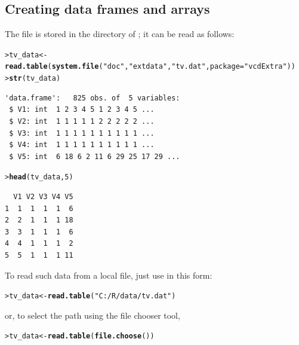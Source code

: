 \documentclass[10pt,krantz2]{krantz}\usepackage[]{graphicx}\usepackage[]{color}
\makeatletter
\newcommand{\hlnum}[1]{\textcolor[rgb]{0.686,0.059,0.569}{#1}}%
\newcommand{\hlstr}[1]{\textcolor[rgb]{0.192,0.494,0.8}{#1}}%
\newcommand{\hlstd}[1]{\textcolor[rgb]{0.345,0.345,0.345}{#1}}%
\newcommand{\hlkwb}[1]{\textcolor[rgb]{0.69,0.353,0.396}{#1}}%
\newcommand{\hlkwc}[1]{\textcolor[rgb]{0.333,0.667,0.333}{#1}}%
\newcommand{\hlkwd}[1]{\textcolor[rgb]{0.737,0.353,0.396}{\textbf{#1}}}%
\newenvironment{kframe}{%
 \def\at@end@of@kframe{}%
 \ifinner\ifhmode%
  \def\at@end@of@kframe{\end{minipage}}%
  \begin{minipage}{\columnwidth}%
 \fi\fi%
 \def\FrameCommand##1{\hskip\@totalleftmargin \hskip-\fboxsep
 \colorbox{shadecolor}{##1}\hskip-\fboxsep
     \hskip-\linewidth \hskip-\@totalleftmargin \hskip\columnwidth}%
 \MakeFramed {\advance\hsize-\width
   \@totalleftmargin\z@ \linewidth\hsize
   \@setminipage}}%
 {\par\unskip\endMakeFramed%
 \at@end@of@kframe}
\newenvironment{knitrout}{}{} %
\renewenvironment{knitrout}{\small\renewcommand{\baselinestretch}{.85}}{} %
\makeatother
\begin{document}
\subsection{Creating data frames and arrays}
The file  is stored in the  directory
of ; it can be read as follows:
\begin{knitrout}
\color{fgcolor}\begin{kframe}
\begin{alltt}
\hlstd{> }\hlstd{tv_data} \hlkwb{<-} \hlkwd{read.table}\hlstd{(}\hlkwd{system.file}\hlstd{(}\hlstr{"doc"}\hlstd{,} \hlstr{"extdata"}\hlstd{,} \hlstr{"tv.dat"}\hlstd{,} \hlkwc{package} \hlstd{=} \hlstr{"vcdExtra"}\hlstd{))}
\hlstd{> }\hlkwd{str}\hlstd{(tv_data)}
\end{alltt}
\begin{verbatim}
'data.frame':	825 obs. of  5 variables:
 $ V1: int  1 2 3 4 5 1 2 3 4 5 ...
 $ V2: int  1 1 1 1 1 2 2 2 2 2 ...
 $ V3: int  1 1 1 1 1 1 1 1 1 1 ...
 $ V4: int  1 1 1 1 1 1 1 1 1 1 ...
 $ V5: int  6 18 6 2 11 6 29 25 17 29 ...
\end{verbatim}
\begin{alltt}
\hlstd{> }\hlkwd{head}\hlstd{(tv_data,} \hlnum{5}\hlstd{)}
\end{alltt}
\begin{verbatim}
  V1 V2 V3 V4 V5
1  1  1  1  1  6
2  2  1  1  1 18
3  3  1  1  1  6
4  4  1  1  1  2
5  5  1  1  1 11
\end{verbatim}
\end{kframe}
\end{knitrout}
To read such data from a local file, just use  in this form:
\begin{knitrout}
\color{fgcolor}\begin{kframe}
\begin{alltt}
\hlstd{> }\hlstd{tv_data} \hlkwb{<-} \hlkwd{read.table}\hlstd{(}\hlstr{"C:/R/data/tv.dat"}\hlstd{)}
\end{alltt}
\end{kframe}
\end{knitrout}
or, to select the path using the file chooser tool,
\begin{knitrout}
\color{fgcolor}\begin{kframe}
\begin{alltt}
\hlstd{> }\hlstd{tv_data} \hlkwb{<-} \hlkwd{read.table}\hlstd{(}\hlkwd{file.choose}\hlstd{())}
\end{alltt}
\end{kframe}
\end{knitrout}
\end{document}
